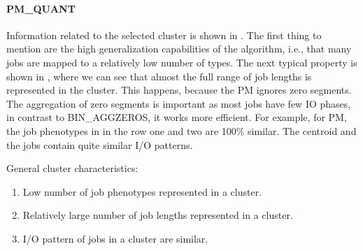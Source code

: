 \documentclass{jhps}
\begin{document}
\paragraph{PM\_QUANT}
Information related to the selected cluster is shown in .
The first thing to mention are the high generalization capabilities of the algorithm, i.e., that many jobs are mapped to a relatively low number of types.
The next typical property is shown in , where we can see that almost the full range of job lengths is represented in the cluster.
This happens, because the PM ignores zero segments.
The aggregation of zero segments is important as most jobs have few IO phases, in contrast to BIN\_AGGZEROS, it works more efficient.
For example, for PM, the job phenotypes in  in the row one and two are 100$\%$ similar.
The centroid and the jobs contain quite similar I/O patterns.

General cluster characteristics:
\begin{enumerate}
 \item Low number of job phenotypes represented in a cluster.
 \item Relatively large number of job lengths represented in a cluster.
 \item I/O pattern of jobs in a cluster are similar.
\end{enumerate}
\end{document}
